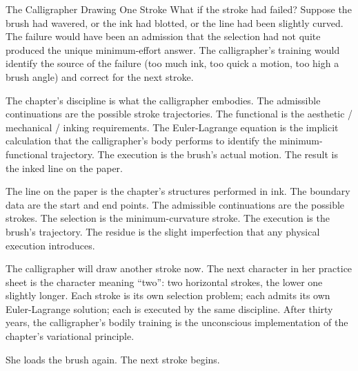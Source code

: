 \begin{coda}{The Calligrapher Drawing One Stroke}
What if the stroke had failed? Suppose the brush had wavered, or
the ink had blotted, or the line had been slightly curved. The
failure would have been an admission that the selection had not
quite produced the unique minimum-effort answer. The
calligrapher's training would identify the source of the failure
(too much ink, too quick a motion, too high a brush angle) and
correct for the next stroke.

The chapter's discipline is what the calligrapher embodies. The
admissible continuations are the possible stroke trajectories.
The functional is the aesthetic / mechanical / inking
requirements. The Euler-Lagrange equation is the implicit
calculation that the calligrapher's body performs to identify
the minimum-functional trajectory. The execution is the brush's
actual motion. The result is the inked line on the paper.

The line on the paper is the chapter's structures performed in
ink. The boundary data are the start and end points. The
admissible continuations are the possible strokes. The selection
is the minimum-curvature stroke. The execution is the brush's
trajectory. The residue is the slight imperfection that any
physical execution introduces.

The calligrapher will draw another stroke now. The next character
in her practice sheet is the character meaning ``two'': two
horizontal strokes, the lower one slightly longer. Each stroke
is its own selection problem; each admits its own
Euler-Lagrange solution; each is executed by the same
discipline. After thirty years, the calligrapher's bodily
training is the unconscious implementation of the chapter's
variational principle.

She loads the brush again. The next stroke begins.

\end{coda}
